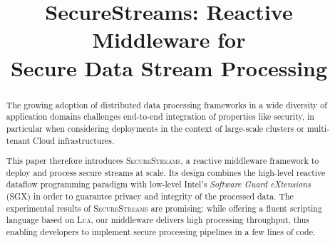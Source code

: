 \documentclass{sig-alternate}
\newcommand{\SYS}{\textsc{SecureStreams}\xspace}
\begin{document}
\title{SecureStreams: Reactive Middleware for\\Secure Data Stream Processing}
\date{}

\author{
}
\sloppy
\maketitle


\begin{abstract}
The growing adoption of distributed data processing frameworks in a wide diversity of application domains challenges end-to-end integration of properties like security, in particular when considering deployments in the context of large-scale clusters or multi-tenant Cloud infrastructures.

This paper therefore introduces \SYS{}, a reactive middleware framework to deploy and process secure streams at scale.
Its design combines the high-level reactive dataflow programming paradigm with low-level Intel's \emph{Software Guard eXtensions} (SGX) in order to guarantee privacy and integrity of the processed data.
The experimental results of \SYS{} are promising: while offering a fluent scripting language based on \textsc{Lua}, our middleware delivers high processing throughput, thus enabling developers to implement secure processing pipelines in a few lines of code.
\end{abstract}




%










\end{document}
